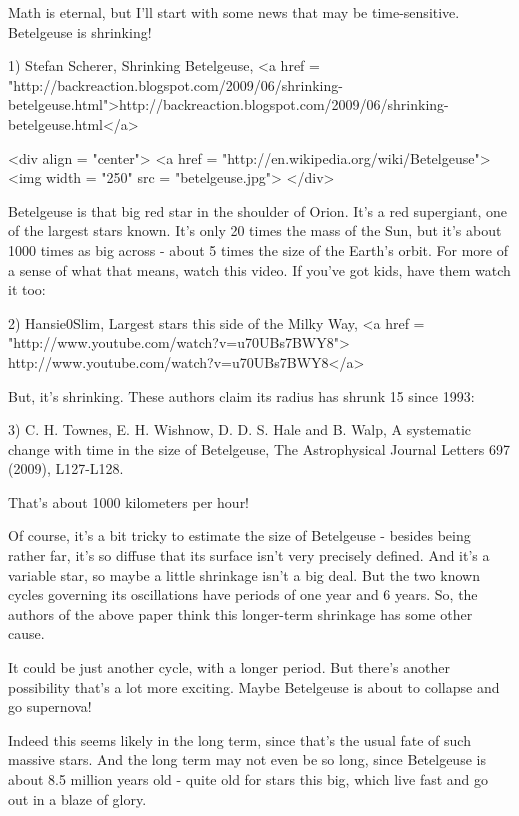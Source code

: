 




Math is eternal, but I'll start with some news that may be
time-sensitive.  Betelgeuse is shrinking!

1) Stefan Scherer, Shrinking Betelgeuse, 
<a href = "http://backreaction.blogspot.com/2009/06/shrinking-betelgeuse.html">http://backreaction.blogspot.com/2009/06/shrinking-betelgeuse.html</a>

<div align = "center">
<a href = "http://en.wikipedia.org/wiki/Betelgeuse">
<img width = "250" src = "betelgeuse.jpg">
</div>

Betelgeuse is that big red star in the shoulder of Orion.  It's a red
supergiant, one of the largest stars known.  It's only 20 times the
mass of the Sun, but it's about 1000 times as big across - about 5
times the size of the Earth's orbit.  For more of a sense of what that
means, watch this video.  If you've got kids, have them watch it too:

2) Hansie0Slim, Largest stars this side of the Milky Way, 
<a href = "http://www.youtube.com/watch?v=u70UBs7BWY8">
http://www.youtube.com/watch?v=u70UBs7BWY8</a>

But, it's shrinking.  These authors claim its radius has shrunk 15%
since 1993:

3) C. H. Townes, E. H. Wishnow, D. D. S. Hale and B. Walp, A
systematic change with time in the size of Betelgeuse, The
Astrophysical Journal Letters 697 (2009), L127-L128.

That's about 1000 kilometers per hour!  

Of course, it's a bit tricky to estimate the size of Betelgeuse -
besides being rather far, it's so diffuse that its surface isn't very
precisely defined.  And it's a variable star, so maybe a little
shrinkage isn't a big deal.  But the two known cycles governing its
oscillations have periods of one year and 6 years.  So, the authors of
the above paper think this longer-term shrinkage has some other cause.

It could be just another cycle, with a longer period.  But there's
another possibility that's a lot more exciting.  Maybe Betelgeuse is 
about to collapse and go supernova!

Indeed this seems likely in the long term, since that's the usual fate
of such massive stars.  And the long term may not even be so long,
since Betelgeuse is about 8.5 million years old - quite old for stars 
this big, which live fast and go out in a blaze of glory.

